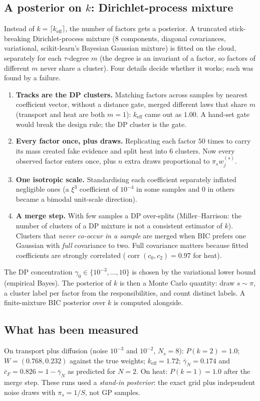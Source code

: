 \documentclass[11pt,a4paper]{article}
\theoremstyle{definition}
\begin{document}
\subsection{A posterior on $k$: Dirichlet-process mixture}
Instead of $k=\lceil k_{\mathrm{eff}}\rceil$, the number of factors gets a posterior. A truncated stick-breaking Dirichlet-process mixture ($8$ components, diagonal covariances, variational, scikit-learn's Bayesian Gaussian mixture) is fitted on the cloud, separately for each $\tau$-degree $m$ (the degree is an invariant of a factor, so factors of different $m$ never share a cluster). Four details decide whether it works; each was found by a failure.
\begin{enumerate}[nosep]
\item \textbf{Tracks are the DP clusters.} Matching factors across samples by nearest coefficient vector, without a distance gate, merged different laws that share $m$ (transport and heat are both $m=1$): $k_{\mathrm{eff}}$ came out as $1.00$. A hand-set gate would break the design rule; the DP cluster is the gate.
\item \textbf{Every factor once, plus draws.} Replicating each factor $50$ times to carry its mass created fake evidence and split heat into 6 clusters. Now every observed factor enters once, plus $n$ extra draws proportional to $\pi_sw^{(s)}_j$.
\item \textbf{One isotropic scale.} Standardising each coefficient separately inflated negligible ones (a $\xi^3$ coefficient of $10^{-4}$ in some samples and $0$ in others became a bimodal unit-scale direction).
\item \textbf{A merge step.} With few samples a DP over-splits (Miller--Harrison: the number of clusters of a DP mixture is not a consistent estimator of $k$). Clusters that \emph{never co-occur in a sample} are merged when BIC prefers one Gaussian with \emph{full} covariance to two. Full covariance matters because fitted coefficients are strongly correlated ($\operatorname{corr}(c_0,c_2)=0.97$ for heat).
\end{enumerate}
The DP concentration $\gamma_0\in\{10^{-3},\dots,10\}$ is chosen by the variational lower bound (empirical Bayes). The posterior of $k$ is then a Monte Carlo quantity: draw $s\sim\pi$, a cluster label per factor from the responsibilities, and count distinct labels. A finite-mixture BIC posterior over $k$ is computed alongside.

\subsection{What has been measured}
On transport plus diffusion (noise $10^{-3}$ and $10^{-2}$, $N_s=8$): $P(k=2)=1.0$; $W=(0.768,0.232)$ against the true weights; $k_{\mathrm{eff}}=1.72$; $\bar\gamma_N=0.174$ and $\bar c_F=0.826=1-\bar\gamma_N$ as predicted for $N=2$. On heat: $P(k=1)=1.0$ after the merge step. These runs used a \emph{stand-in posterior}: the exact grid plus independent noise draws with $\pi_s=1/S$, not GP samples.
\end{document}
